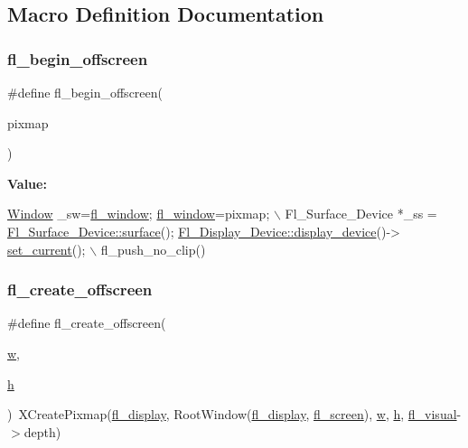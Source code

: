 \subsection{Macro Definition Documentation}
\mbox{\label{x_8_h_a3c731ad1bba67a9e40f91e23d10eb884}} 
\subsubsection{\texorpdfstring{fl\+\_\+begin\+\_\+offscreen}{fl\_begin\_offscreen}}
{\footnotesize\ttfamily \#define fl\+\_\+begin\+\_\+offscreen(\begin{DoxyParamCaption}\item[{}]{pixmap }\end{DoxyParamCaption})}

{\bfseries Value\+:}
\begin{DoxyCode}
\hyperlink{mac_8_h_a213656d363e884b651cc92f58e863fc6}{Window} \_sw=\hyperlink{x_8_h_afdab6664143864c36ba6b51782b32500}{fl\_window}; \hyperlink{x_8_h_afdab6664143864c36ba6b51782b32500}{fl\_window}=pixmap; \(\backslash\)
  Fl\_Surface\_Device *\_ss = \hyperlink{class_fl___surface___device_a6a2643e352fdcb9e78faa167d1cd0a14}{Fl\_Surface\_Device::surface}(); 
      \hyperlink{class_fl___display___device_a888806f46c16a0c6cc7297fe553f535c}{Fl\_Display\_Device::display\_device}()->
      \hyperlink{class_fl___surface___device_a6f88aed1b68854433d60cf23731c3d79}{set\_current}(); \(\backslash\)
  fl\_push\_no\_clip()
\end{DoxyCode}
\mbox{\label{x_8_h_ac052986a562eabf83386c3f2a209954d}} 
\subsubsection{\texorpdfstring{fl\+\_\+create\+\_\+offscreen}{fl\_create\_offscreen}}
{\footnotesize\ttfamily \#define fl\+\_\+create\+\_\+offscreen(\begin{DoxyParamCaption}\item[{}]{\hyperlink{forms_8_h_aac374e320caaadeca4874add33b62af2}{w},  }\item[{}]{\hyperlink{forms_8_h_a7e427ba5b307f9068129699250690066}{h} }\end{DoxyParamCaption})~X\+Create\+Pixmap(\hyperlink{x_8_h_ae4842a1fc7d2d7b95afeaba5611fc426}{fl\+\_\+display}, Root\+Window(\hyperlink{x_8_h_ae4842a1fc7d2d7b95afeaba5611fc426}{fl\+\_\+display}, \hyperlink{x_8_h_a42a55d8c59138d9f0fa899491c25560c}{fl\+\_\+screen}), \hyperlink{forms_8_h_aac374e320caaadeca4874add33b62af2}{w}, \hyperlink{forms_8_h_a7e427ba5b307f9068129699250690066}{h}, \hyperlink{x_8_h_abe861b6ba1d71b2f73e3883c10ac5c27}{fl\+\_\+visual}-\/$>$depth)}

